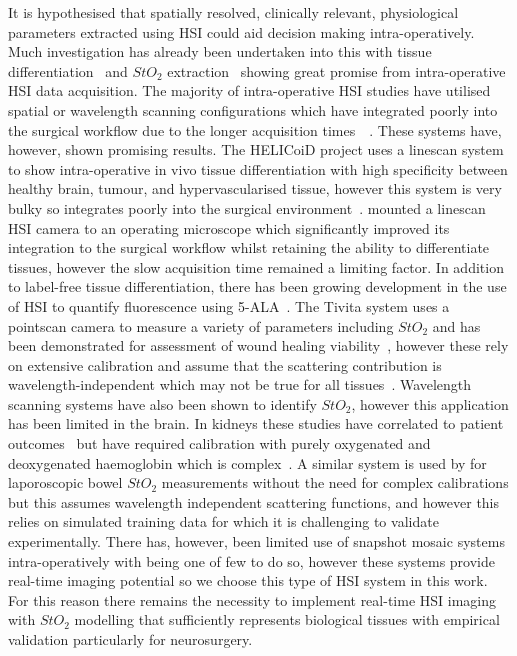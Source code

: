 It is hypothesised that spatially resolved, clinically relevant, physiological parameters extracted using HSI could aid decision making intra-operatively. Much investigation has already been undertaken into this with tissue differentiation~\cite{Kabwama2016, Fabelo2019, Kho2019, Giannantonio2023} and $StO_2$ extraction~\cite{Yudovsky2015, Clancy2015, WOS:000360241100026, Wirkert2016, Clancy2020, Thoenissen2023} showing great promise from intra-operative HSI data acquisition. The majority of intra-operative HSI studies have utilised spatial or wavelength scanning configurations which have integrated poorly into the surgical workflow due to the longer acquisition times~~\cite{Shapey2019, MacCormac2023, Fabelo2019}. These systems have, however, shown promising results. The HELICoiD project uses a linescan system to show intra-operative in vivo tissue differentiation with high specificity between healthy brain, tumour, and hypervascularised tissue, however this system is very bulky so integrates poorly into the surgical environment~\cite{Fabelo2019, Fabelo2019a, Kabwama2016}.  mounted a linescan HSI camera to an operating microscope which significantly improved its integration to the surgical workflow whilst retaining the ability to differentiate tissues, however the slow acquisition time remained a limiting factor. In addition to label-free tissue differentiation, there has been growing development in the use of HSI to quantify fluorescence using 5-ALA~\cite{Walke2023}. The Tivita system uses a pointscan camera to measure a variety of parameters including $StO_2$ and has been demonstrated for assessment of wound healing viability~\cite{Thoenissen2023}, however these rely on extensive calibration and assume that the scattering contribution is wavelength-independent which may not be true for all tissues~\cite{Holmer2018, Jacques2013}. Wavelength scanning systems have also been shown to identify $StO_2$, however this application has been limited in the brain. In kidneys these studies have correlated to patient outcomes~\cite{Liu2013} but have required calibration with purely oxygenated and deoxygenated haemoglobin which is complex~\cite{Zuzak2002}. A similar system is used by  for laporoscopic bowel $StO_2$ measurements without the need for complex calibrations but this assumes wavelength independent scattering functions, and \cite{Wirkert2016} however this relies on simulated training data for which it is challenging to validate experimentally. There has, however, been limited use of snapshot mosaic systems intra-operatively with  being one of few to do so, however these systems provide real-time imaging potential so we choose this type of HSI system in this work. For this reason there remains the necessity to implement real-time HSI imaging with $StO_2$ modelling that sufficiently represents biological tissues with empirical validation particularly for neurosurgery. 

